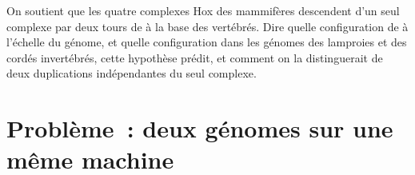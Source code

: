 \begin{exercise}[$\star\star\star$]\label{exo:b3:genomics:12}
On soutient que les quatre complexes Hox des mammifères descendent d'un
seul complexe par deux tours de  à la base
des vertébrés. Dire quelle configuration de  à l'échelle du
génome, et quelle configuration dans les génomes des lamproies et des
cordés invertébrés, cette hypothèse prédit, et comment on la
distinguerait de deux duplications indépendantes du seul complexe.
\end{exercise}

\section{Problème~: deux génomes sur une même machine}

